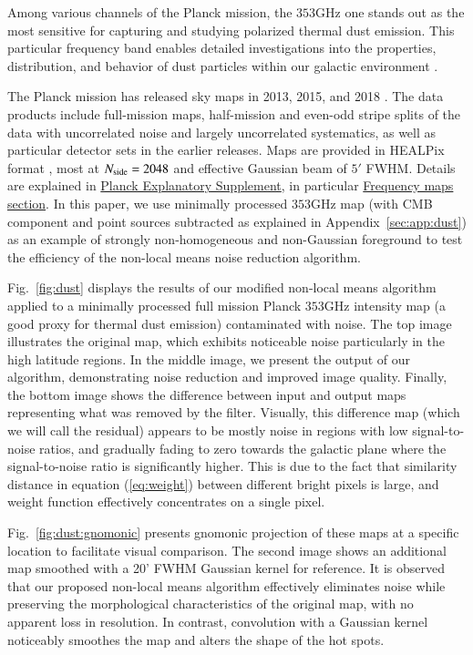 \documentclass{aa}
\newcommand{\nside}{\ensuremath N_{\text{side}}}
\begin{document}
Among various channels of the Planck mission, the $353$GHz one stands out as the most sensitive for capturing and studying polarized thermal dust emission. This particular frequency band enables detailed investigations into the properties, distribution, and behavior of dust particles within our galactic environment \citep{2020A&A...641A..12P}.

The Planck mission has released sky maps in 2013, 2015, and 2018 \citep{2014A&A...571A...1P, 2016A&A...594A...1P, 2020A&A...641A...2P, 2020A&A...641A...3P}. The data products include full-mission maps, half-mission and even-odd stripe splits of the data with uncorrelated noise and largely uncorrelated systematics, as well as particular detector sets in the earlier releases. Maps are provided in HEALPix format \citep{2005ApJ...622..759G}, most at $\nside=2048$ and effective Gaussian beam of $5'$ FWHM. Details are explained in \href{https://wiki.cosmos.esa.int/planck-legacy-archive/index.php/Main_Page}{Planck Explanatory Supplement}, in particular \href{https://wiki.cosmos.esa.int/planck-legacy-archive/index.php/Frequency_maps}{Frequency maps section}. In this paper, we use minimally processed $353$GHz map (with CMB component and point sources subtracted as explained in Appendix~\ref{sec:app:dust}) as an example of strongly non-homogeneous and non-Gaussian foreground to test the efficiency of the non-local means noise reduction algorithm.

Fig.~\ref{fig:dust} displays the results of our modified non-local means algorithm applied to a minimally processed full mission Planck $353$GHz intensity map (a good proxy for thermal dust emission) contaminated with noise. The top image illustrates the original map, which exhibits noticeable noise particularly in the high latitude regions. In the middle image, we present the output of our algorithm, demonstrating noise reduction and improved image quality. Finally, the bottom image shows the difference between input and output maps representing what was removed by the filter. Visually, this difference map (which we will call the residual) appears to be mostly noise in regions with low signal-to-noise ratios, and gradually fading to zero towards the galactic plane where the signal-to-noise ratio is significantly higher. This is due to the fact that similarity distance in equation (\ref{eq:weight}) between different bright pixels is large, and weight function effectively concentrates on a single pixel.

Fig.~\ref{fig:dust:gnomonic} presents gnomonic projection of these maps at a specific location to facilitate visual comparison. The second image shows an additional map smoothed with a 20' FWHM Gaussian kernel for reference. It is observed that our proposed non-local means algorithm effectively eliminates noise while preserving the morphological characteristics of the original map, with no apparent loss in resolution. In contrast, convolution with a Gaussian kernel noticeably smoothes the map and alters the shape of the hot spots.
\end{document}
